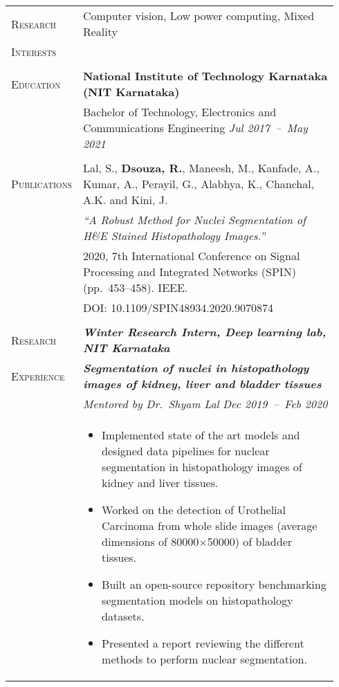 \documentclass[letterpaper, 10pt, oneside]{article}
\newcommand{\stitle}[1]{\normalsize{\textsc{#1}}}
\newcommand{\bdit}[1]{\textit{\textbf{#1}}}
\begin{document}
\noindent \begin{longtable}{@{} p{0.14\linewidth} p{0.8\linewidth}}

\stitle{Research}  & Computer vision, Low power computing, Mixed Reality \\
\stitle{Interests} & \\
\\


\stitle{Education} & \textbf{National Institute of Technology Karnataka (NIT Karnataka)} \\
                   & Bachelor of Technology, Electronics and Communications Engineering \hfill \hspace{-3em} \textit{Jul 2017\ --\ May 2021} \\
\\


\stitle{Publications} & Lal, S., \textbf{Dsouza, R.}, Maneesh, M., Kanfade, A., Kumar, A., Perayil, G., Alabhya, K., Chanchal, A.K. and Kini, J. \\
                      & \textit{``A Robust Method for Nuclei Segmentation of H\&E Stained Histopathology Images.''} \\
                      & 2020, 7th International Conference on Signal Processing and Integrated Networks (SPIN) (pp.~453--458)\@. IEEE\@.  \\
                      & \textcolor{dark-purple}{DOI\@: 10.1109/SPIN48934.2020.9070874} \\
\\


\stitle{Research}   & \bdit{Winter Research Intern, Deep learning lab, NIT Karnataka} \\
\stitle{Experience} & \bdit{Segmentation of nuclei in histopathology images of kidney, liver and bladder tissues} \\
                    & \textit{Mentored by Dr.\ Shyam Lal} \hfill \hspace{-3em} \textit{Dec 2019\ --\ Feb 2020} \\
                    & \parbox{0.8\textwidth}{%
                        \begin{itemize}[leftmargin=*, itemsep=-0.88ex, topsep=-0.88ex]
                            \item Implemented state of the art models and designed data pipelines for nuclear segmentation in histopathology images of kidney and liver tissues. 
                            \item Worked on the detection of Urothelial Carcinoma from whole slide images (average dimensions of 80000$\times$50000) of bladder tissues.
                            \item Built an open-source repository benchmarking segmentation models on histopathology datasets.
                            \item Presented a report reviewing the different methods to perform nuclear segmentation.
                        \end{itemize}
                    }
\\
\\


\end{longtable}
\end{document}
